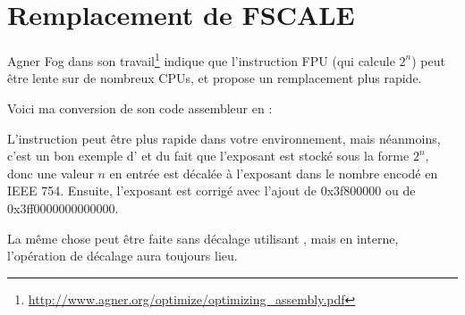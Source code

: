 \section{Remplacement de FSCALE}

Agner Fog dans son travail\footnote{\url{http://www.agner.org/optimize/optimizing_assembly.pdf}}
indique que l'instruction \ac{FPU}  (qui calcule $2^n$) peut être lente
sur de nombreux CPUs, et propose un remplacement plus rapide.

Voici ma conversion de son code assembleur en \CCpp:



L'instruction  peut être plus rapide dans votre environnement, mais néanmoins,
c'est un bon exemple d' et du fait que l'exposant est stocké sous la forme
$2^n$, donc une valeur $n$ en entrée est décalée à l'exposant dans le nombre encodé
en IEEE 754.
Ensuite, l'exposant est corrigé avec l'ajout de 0x3f800000 ou de 0x3ff0000000000000.

La même chose peut être faite sans décalage utilisant , mais en interne,
l'opération de décalage aura toujours lieu.


